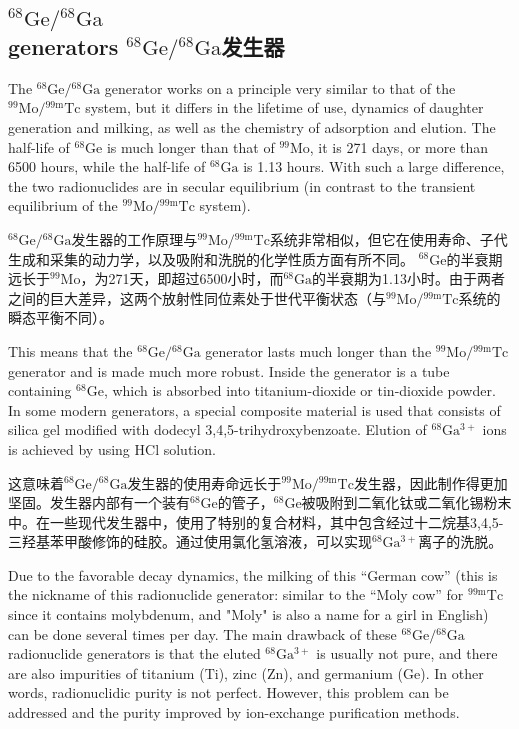 \documentclass[dvipsnames, svgnames,a4paper,11pt]{article}
\begin{document}
\subsection{\(\mathrm{^{68}Ge}/\mathrm{^{68}Ga}\)\\ generators \(\mathrm{^{68}Ge}/\mathrm{^{68}Ga}\)发生器}  
The \(\mathrm{^{68}Ge}/\mathrm{^{68}Ga}\) generator works on a principle very similar to that of the \(\mathrm{^{99}Mo}/\mathrm{^{99m}Tc}\) system, but it differs in the lifetime of use, dynamics of daughter generation and milking, as well as the chemistry of adsorption and elution. The half-life of \(\mathrm{^{68}Ge}\) is much longer than that of \(\mathrm{^{99}Mo}\), it is 271 days, or more than 6500 hours, while the half-life of \(\mathrm{^{68}Ga}\) is 1.13 hours. With such a large difference, the two radionuclides are in secular equilibrium (in contrast to the transient equilibrium of the \(\mathrm{^{99}Mo}/\mathrm{^{99m}Tc}\) system).  

\(\mathrm{^{68}Ge}/\mathrm{^{68}Ga}\)发生器的工作原理与\(\mathrm{^{99}Mo}/\mathrm{^{99m}Tc}\)系统非常相似，但它在使用寿命、子代生成和采集的动力学，以及吸附和洗脱的化学性质方面有所不同。 \(\mathrm{^{68}Ge}\)的半衰期远长于\(\mathrm{^{99}Mo}\)，为271天，即超过6500小时，而\(\mathrm{^{68}Ga}\)的半衰期为1.13小时。由于两者之间的巨大差异，这两个放射性同位素处于世代平衡状态（与\(\mathrm{^{99}Mo}/\mathrm{^{99m}Tc}\)系统的瞬态平衡不同）。  

This means that the \(\mathrm{^{68}Ge}/\mathrm{^{68}Ga}\) generator lasts much longer than the \(\mathrm{^{99}Mo}/\mathrm{^{99m}Tc}\) generator and is made much more robust. Inside the generator is a tube containing \(\mathrm{^{68}Ge}\), which is absorbed into titanium-dioxide or tin-dioxide powder. In some modern generators, a special composite material is used that consists of silica gel modified with dodecyl 3,4,5-trihydroxybenzoate. Elution of \(\mathrm{^{68}Ga^{3+}}\) ions is achieved by using HCl solution.  

这意味着\(\mathrm{^{68}Ge}/\mathrm{^{68}Ga}\)发生器的使用寿命远长于\(\mathrm{^{99}Mo}/\mathrm{^{99m}Tc}\)发生器，因此制作得更加坚固。发生器内部有一个装有\(\mathrm{^{68}Ge}\)的管子，\(\mathrm{^{68}Ge}\)被吸附到二氧化钛或二氧化锡粉末中。在一些现代发生器中，使用了特别的复合材料，其中包含经过十二烷基3,4,5-三羟基苯甲酸修饰的硅胶。通过使用氯化氢溶液，可以实现\(\mathrm{^{68}Ga^{3+}}\)离子的洗脱。  


Due to the favorable decay dynamics, the milking of this “German cow” (this is the nickname of this radionuclide generator: similar to the “Moly cow” for \(\mathrm{^{99m}Tc}\) since it contains molybdenum, and "Moly" is also a name for a girl in English) can be done several times per day. The main drawback of these \(\mathrm{^{68}Ge}/\mathrm{^{68}Ga}\) radionuclide generators is that the eluted \(\mathrm{^{68}Ga^{3+}}\) is usually not pure, and there are also impurities of titanium (\(\mathrm{Ti}\)), zinc (\(\mathrm{Zn}\)), and germanium (\(\mathrm{Ge}\)). In other words, radionuclidic purity is not perfect. However, this problem can be addressed and the purity improved by ion-exchange purification methods.
\end{document}
